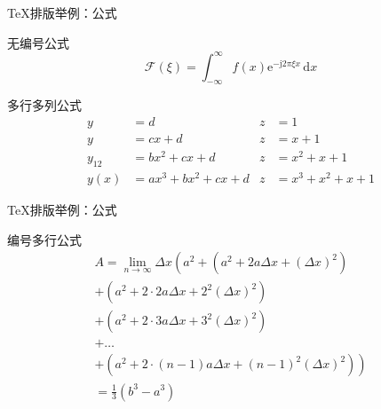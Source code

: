 \begin{frame}{\TeX{}排版举例：公式}
  \begin{exampleblock}{无编号公式}
    \begin{equation*}
      \mathcal{F}(\xi)=\int_{-\infty}^{\infty}\!\!
      f(x)\mathrm{e}^{-\mathrm{j}2\pi \xi x}\,\mathrm{d}x
    \end{equation*}
  \end{exampleblock}
  \begin{exampleblock}{多行多列公式}
    \begin{align}
      y & =d & z & =1\\
      y & =cx+d & z & =x+1\\
      y_{12} & =bx^{2}+cx+d & z & =x^{2}+x+1\nonumber \\
      y(x) & =ax^{3}+bx^{2}+cx+d & z & =x^{3}+x^{2}+x+1
    \end{align}
  \end{exampleblock}
\end{frame}

\begin{frame}{\TeX{}排版举例：公式}
  \begin{exampleblock}{编号多行公式}
    \begin{multline}
    A=\lim_{n\rightarrow\infty}\Delta x\left(a^{2}+\left(a^{2}+2a\Delta x+\left(\Delta x\right)^{2}\right)\right.\label{eq:reset}\\
    +\left(a^{2}+2\cdot2a\Delta x+2^{2}\left(\Delta x\right)^{2}\right)\\
    +\left(a^{2}+2\cdot3a\Delta x+3^{2}\left(\Delta x\right)^{2}\right)\\
    +\ldots\\
    \left.+\left(a^{2}+2\cdot(n-1)a\Delta x+(n-1)^{2}\left(\Delta x\right)^{2}\right)\right)\\
    =\frac{1}{3}\left(b^{3}-a^{3}\right)
  \end{multline}
\end{exampleblock}
\end{frame}

